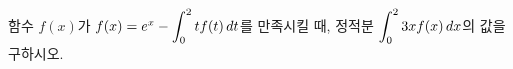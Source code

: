 \hspace*{2mm}\begin{minipage}[t]{\dimexpr\linewidth-2mm\relax}\vspace{0pt}
함수 $f(x)$가 $f(x)=e^x-\displaystyle\int_{0}^{2}tf(t)\mkern3mu dt$를 만족시킬 때, 정적분 $\displaystyle\int_{0}^{2}3xf(x)\mkern3mu dx$의 값을 구하시오.\end{minipage}
